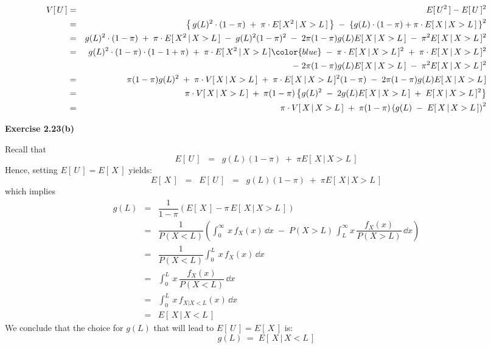 \begin{eqnarray*}
V[\,U\,]
&=& E[\,U^{2}\,] - E[\,U\,]^{2} \\
&=&       \left\{\,g(L)^{2}\cdot(1-\pi) \;+\; \pi\cdot E[\,X^{2}\,\vert\,X>L\,]\,\right\}
    \;-\; \left\{g(L) \cdot (1 - \pi) + \pi\cdot E[\,X\,\vert\, X > L\,]\,\right\}^{2}
\\
&=&       g(L)^{2}\cdot(1-\pi) \;+\; \pi\cdot E[\,X^{2}\,\vert\,X>L\,]
    \;-\; g(L)^{2}(1 - \pi)^{2} \;-\; 2\pi(1-\pi)g(L)E[\,X\,\vert\, X > L\,]
    \;-\; \pi^{2} E[\,X\,\vert\, X > L\,]^{2}
\\
&=&       g(L)^{2}\cdot(1-\pi)\cdot(1-1+\pi) \;+\; \pi\cdot E[\,X^{2}\,\vert\,X>L\,]
    {\color{blue}\;-\; \pi\cdot E[\,X\,\vert\,X>L\,]^{2} \;+\; \pi\cdot E[\,X\,\vert\,X>L\,]^{2}} \\
&&  \;-\; 2\pi(1-\pi)g(L)E[\,X\,\vert\, X > L\,]
    \;-\; \pi^{2} E[\,X\,\vert\, X > L\,]^{2}
\\
&=&       \pi(1-\pi)g(L)^{2} \;+\; \pi\cdot V[\,X\,\vert\,X>L\,]
    \;+\; \pi\cdot E[\,X\,\vert\,X>L\,]^{2}(1-\pi)
    \;-\; 2\pi(1-\pi)g(L)E[\,X\,\vert\, X > L\,]
\\
&=&       \pi\cdot V[\,X\,\vert\,X>L\,]
    \;+\; \pi(1-\pi)\left\{
          g(L)^{2} \;-\; 2 g(L) E[\,X\,\vert\, X > L\,] \;+\; E[\,X\,\vert\,X>L\,]^{2}
          \right\}
\\
&=&       \pi\cdot V[\,X\,\vert\,X>L\,]
    \;+\; \pi(1-\pi)\left( g(L) \;-\; E[\,X\,\vert\, X > L\,] \right)^{2}
\end{eqnarray*}

\vskip 1.0cm
\noindent
\textbf{Exercise 2.23(b)}

\vskip 0.3cm
\noindent
Recall that
\begin{equation*}
E[\,U\,]
\;\; = \;\; g(L)(1 - \pi) \;+\; \pi E[\,X\,\vert\,X > L\,]
\end{equation*}
Hence, setting $E[\,U\,] = E[\,X\,]$ yields:
\begin{equation*}
E[\,X\,]
\;\;=\;\; E[\,U\,]
\;\;=\;\; g(L)(1 - \pi) \;+\; \pi E[\,X\,\vert\,X > L\,]
\end{equation*}
which implies
\begin{eqnarray*}
g(L)
&=& \dfrac{1}{1-\pi}\left(E[\,X\,] - \pi\,E[\,X\,\vert\,X>L\,]\right) \\
&=& \dfrac{1}{P(X<L)}\left(
          \int_{0}^{\infty}\,x\,f_{X}(x)\,\dd x
    \;-\; P(X>L)\,\int_{L}^{\infty}x\,\dfrac{f_{X}(x)}{P(X>L)}\,\dd x
    \right) \\
&=& \dfrac{1}{P(X<L)} \int_{0}^{L}\,x\,f_{X}(x)\,\dd x \\
&=& \int_{0}^{L}\,x\,\dfrac{f_{X}(x)}{P(X<L)}\,\dd x \\
&=& \int_{0}^{L}\,x\,f_{X|X<L}(x)\,\dd x \\
&=& E[\,X\,\vert\,X<L\,]
\end{eqnarray*}
We conclude that the choice for $g(L)$ that will lead to $E[\,U\,] = E[\,X\,]$ is:
\begin{equation*}
g(L) \;=\; E[\,X\,\vert\,X<L\,]
\end{equation*}

